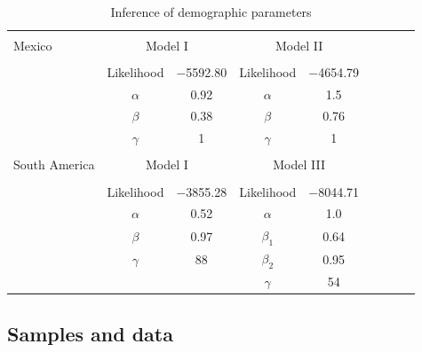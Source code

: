 \renewcommand{\arraystretch}{1.1}
\begin{table}[tb]

\begin{center}
 \caption[]{Inference of demographic parameters\hspace*{0.3cm}}
  \textbf{}\\[-2mm]
{\fontsize{7}{11}\sf
    \begin{tabular}{lcccccccl} \hline
       & & \\[-3mm]
     Mexico  & \multicolumn{2}{c}{Model I}  &\multicolumn{2}{c}{Model II}\\[0.1cm]
    \hline
    & & \\[-3mm]
   & Likelihood   & $-$5592.80 & Likelihood       &  $-$4654.79 \\
   &$\alpha$      & 0.92             & $\alpha$        & 1.5 \\
   &$\beta$        & 0.38             & $\beta$          & 0.76\\ 
   &$\gamma$   & 1                   &  $\gamma$   & 1\\ 
      \hline
    & & \\[-3mm]
    South America  & \multicolumn{2}{c}{Model I}  &\multicolumn{2}{c}{Model III}\\[0.1cm]
        \hline
     & & \\[-3mm]
      & Likelihood   &  $-$3855.28 & Likelihood     &  $-$8044.71 \\
      &$\alpha$      & 0.52              & $\alpha$       & 1.0 \\
      &$\beta$        & 0.97             & $\beta_1$      & 0.64\\ 
      &$\gamma$   & 88                &  $\beta_2$     & 0.95\\ 
      &                    &                     &  $\gamma$    & 54\\ [1mm]
    \hline
    \end{tabular}
    \label{param}  %
}
\end{center}
\end{table}
\renewcommand{\arraystretch}{1}


\subsection*{Samples and data}

